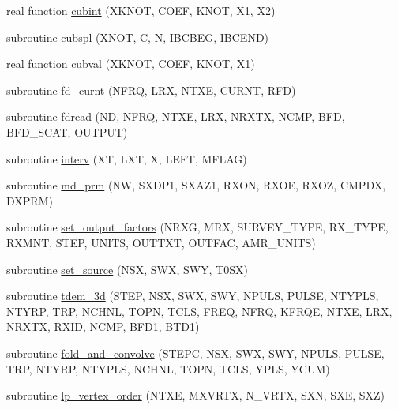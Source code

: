 \begin{DoxyCompactItemize}
\item 
real function \hyperlink{Marco_8f90_a0cebd439e7e54c21b37436ef4c5da9ca}{cubint} (X\+K\+N\+OT, C\+O\+EF, K\+N\+OT, X1, X2)
\item 
subroutine \hyperlink{Marco_8f90_a108ddb07c94297e8965b149f8e8b0b10}{cubspl} (X\+N\+OT, C, N, I\+B\+C\+B\+EG, I\+B\+C\+E\+ND)
\item 
real function \hyperlink{Marco_8f90_ab1863f6d59c2ac8a89880c1b6cc8cbe9}{cubval} (X\+K\+N\+OT, C\+O\+EF, K\+N\+OT, X1)
\item 
subroutine \hyperlink{Marco_8f90_a26a547e1b65b547041c0eac9e900a10d}{fd\+\_\+curnt} (N\+F\+RQ, L\+RX, N\+T\+XE, C\+U\+R\+NT, R\+FD)
\item 
subroutine \hyperlink{Marco_8f90_abbb41678ead372cf2ac619487c6fe732}{fdread} (ND, N\+F\+RQ, N\+T\+XE, L\+RX, N\+R\+X\+TX, N\+C\+MP, B\+FD, B\+F\+D\+\_\+\+S\+C\+AT, O\+U\+T\+P\+UT)
\item 
subroutine \hyperlink{Marco_8f90_ab3d44a77ee1868f9a09dcac7e6bfcdce}{interv} (XT, L\+XT, X, L\+E\+FT, M\+F\+L\+AG)
\item 
subroutine \hyperlink{Marco_8f90_aa2f07b2e4c088385937e889ca561a4c4}{md\+\_\+prm} (NW, S\+X\+D\+P1, S\+X\+A\+Z1, R\+X\+ON, R\+X\+OE, R\+X\+OZ, C\+M\+P\+DX, D\+X\+P\+RM)
\item 
subroutine \hyperlink{Marco_8f90_a9bd15661efc3d31965bbbb37b06cb37f}{set\+\_\+output\+\_\+factors} (N\+R\+XG, M\+RX, S\+U\+R\+V\+E\+Y\+\_\+\+T\+Y\+PE, R\+X\+\_\+\+T\+Y\+PE, R\+X\+M\+NT, S\+T\+EP, U\+N\+I\+TS, O\+U\+T\+T\+XT, O\+U\+T\+F\+AC, A\+M\+R\+\_\+\+U\+N\+I\+TS)
\item 
subroutine \hyperlink{Marco_8f90_a64c5bf1e6006ac36e86c8ff7014ecab7}{set\+\_\+source} (N\+SX, S\+WX, S\+WY, T0\+SX)
\item 
subroutine \hyperlink{Marco_8f90_afe01227236073e58a677de51fccb36ba}{tdem\+\_\+3d} (S\+T\+EP, N\+SX, S\+WX, S\+WY, N\+P\+U\+LS, P\+U\+L\+SE, N\+T\+Y\+P\+LS, N\+T\+Y\+RP, T\+RP, N\+C\+H\+NL, T\+O\+PN, T\+C\+LS, F\+R\+EQ, N\+F\+RQ, K\+F\+R\+QE, N\+T\+XE, L\+RX, N\+R\+X\+TX, R\+X\+ID, N\+C\+MP, B\+F\+D1, B\+T\+D1)
\item 
subroutine \hyperlink{Marco_8f90_adf5b72e5e0c8b51d6d076cc274531811}{fold\+\_\+and\+\_\+convolve} (S\+T\+E\+PC, N\+SX, S\+WX, S\+WY, N\+P\+U\+LS, P\+U\+L\+SE, T\+RP, N\+T\+Y\+RP, N\+T\+Y\+P\+LS, N\+C\+H\+NL, T\+O\+PN, T\+C\+LS, Y\+P\+LS, Y\+C\+UM)
\item 
subroutine \hyperlink{Marco_8f90_acbb31184506555aa865f529467a59933}{lp\+\_\+vertex\+\_\+order} (N\+T\+XE, M\+X\+V\+R\+TX, N\+\_\+\+V\+R\+TX, S\+XN, S\+XE, S\+XZ)

\end{DoxyCompactItemize}
